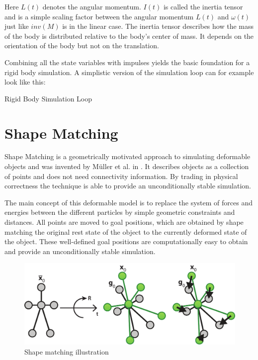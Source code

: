 Here $L(t)$ denotes the angular momentum. $I(t)$ is called the inertia tensor and is a simple scaling factor between the angular momentum $L(t)$ and $\omega(t)$ just like $inv(M)$ is in the linear case. The inertia tensor describes how the mass of the body is distributed relative to the body's center of mass. It depends on the orientation of the body but not on the translation.

Combining all the state variables with impulses yields the basic foundation for a rigid body simulation. A simplistic version of the simulation loop can for example look like this:

\clearpage

\begin{algorithm}[t!]
\caption{Rigid Body Simulation Loop}
\begin{algorithmic}[1]
\ENDFOR
{}
	\ENDFOR
\ENDFOR
{}
\ENDFOR
{}
\ENDFOR
\end{algorithmic}
\end{algorithm}

\section{Shape Matching}
\label{sec:shape_matching}

Shape Matching is a geometrically motivated approach to simulating deformable objects and was invented by M{\"u}ller et al. in \cite{Muller:2005fi}. It describes objects as a collection of points and does not need connectivity information. By trading in physical correctness the technique is able to provide an unconditionally stable simulation. 

The main concept of this deformable model is to replace the system of forces and energies between the different particles by simple geometric constraints and distances. All points are moved to goal positions, which are obtained by shape matching the original rest state of the object to the currently deformed state of the object. These well-defined goal positions are computationally easy to obtain and provide an unconditionally stable simulation.

\begin{figure}[h]
\centering
\includegraphics[width=.96\textwidth]{images/shape_matching.pdf}
\caption{Shape matching illustration}
\label{img:shape_matching}
\end{figure}

